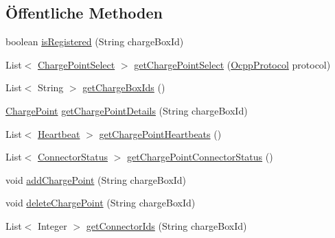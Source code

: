 \subsection*{Öffentliche Methoden}
\begin{DoxyCompactItemize}
\item 
boolean \hyperlink{classde_1_1rwth_1_1idsg_1_1steve_1_1repository_1_1_charge_point_repository_impl_a4ae3e76c34f39cf6e72f48d608b6d511}{is\-Registered} (String charge\-Box\-Id)
\item 
List$<$ \hyperlink{classde_1_1rwth_1_1idsg_1_1steve_1_1repository_1_1dto_1_1_charge_point_select}{Charge\-Point\-Select} $>$ \hyperlink{classde_1_1rwth_1_1idsg_1_1steve_1_1repository_1_1_charge_point_repository_impl_a7be1506cf87a9161535c228333011c01}{get\-Charge\-Point\-Select} (\hyperlink{enumde_1_1rwth_1_1idsg_1_1steve_1_1ocpp_1_1_ocpp_protocol}{Ocpp\-Protocol} protocol)
\item 
List$<$ String $>$ \hyperlink{classde_1_1rwth_1_1idsg_1_1steve_1_1repository_1_1_charge_point_repository_impl_a43295c2e6430138cc08b8ce3e4fcd79b}{get\-Charge\-Box\-Ids} ()
\item 
\hyperlink{classde_1_1rwth_1_1idsg_1_1steve_1_1repository_1_1dto_1_1_charge_point}{Charge\-Point} \hyperlink{classde_1_1rwth_1_1idsg_1_1steve_1_1repository_1_1_charge_point_repository_impl_a4d72c9981acc2118b2f45e35d72a9963}{get\-Charge\-Point\-Details} (String charge\-Box\-Id)
\item 
List$<$ \hyperlink{classde_1_1rwth_1_1idsg_1_1steve_1_1repository_1_1dto_1_1_heartbeat}{Heartbeat} $>$ \hyperlink{classde_1_1rwth_1_1idsg_1_1steve_1_1repository_1_1_charge_point_repository_impl_a031dfc86d61eb01a77e1c03dc00a474d}{get\-Charge\-Point\-Heartbeats} ()
\item 
List$<$ \hyperlink{classde_1_1rwth_1_1idsg_1_1steve_1_1repository_1_1dto_1_1_connector_status}{Connector\-Status} $>$ \hyperlink{classde_1_1rwth_1_1idsg_1_1steve_1_1repository_1_1_charge_point_repository_impl_abf311e254ff9be11ef122e5fa5629ffb}{get\-Charge\-Point\-Connector\-Status} ()
\item 
void \hyperlink{classde_1_1rwth_1_1idsg_1_1steve_1_1repository_1_1_charge_point_repository_impl_aa7290b607df9e3d0a693e6b6ecc96523}{add\-Charge\-Point} (String charge\-Box\-Id)
\item 
void \hyperlink{classde_1_1rwth_1_1idsg_1_1steve_1_1repository_1_1_charge_point_repository_impl_a652dfb1e8b5f127b61ebf6a185287734}{delete\-Charge\-Point} (String charge\-Box\-Id)
\item 
List$<$ Integer $>$ \hyperlink{classde_1_1rwth_1_1idsg_1_1steve_1_1repository_1_1_charge_point_repository_impl_a9e222440e627fd00df86fcb4a190cb2c}{get\-Connector\-Ids} (String charge\-Box\-Id)
\end{DoxyCompactItemize}


